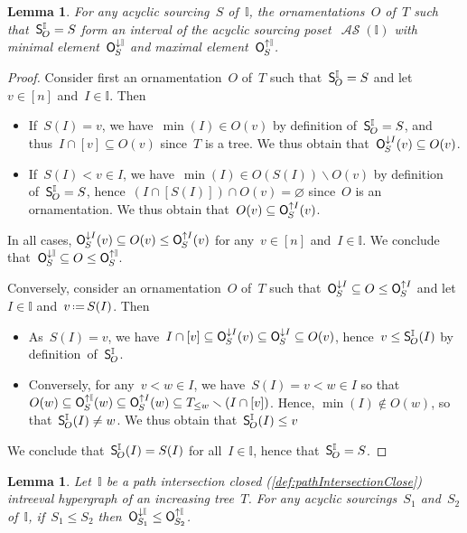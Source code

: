 \documentclass{amsart}
\newtheorem{lemma}[theorem]{Lemma}
\theoremstyle{definition}
\newcommand{\ssm}{\smallsetminus} %
\newcommand{\eqdef}{\mbox{\,\raisebox{0.2ex}{\scriptsize\ensuremath{\mathrm:}}\ensuremath{=}\,}} %
\newcommand{\lessin}[2]{#1_{\le#2}} %
\newcommand{\mymap}[2]{\mathsf{#1}_{\hspace{-.7pt}#2}}
\newcommand{\minorn}[2]{\mymap{O}{#1}^{\downarrow#2}}  %
\newcommand{\maxorn}[2]{\mymap{O}{#1}^{\uparrow#2}}  %
\newcommand{\sour}[1]{\mymap{S}{#1}}  %
\DeclareMathOperator{\ASour}{\mathcal{AS}}  %
\newcommand{\II}{\mathbb I} %
\begin{document}
\begin{lemma}
\label{lem:Sour2OrnIntreeval2}
For any acyclic sourcing~$S$ of~$\II$, the ornamentations~$O$ of~$T$ such that~$\sour{O}^\II = S$ form an interval of the acyclic sourcing poset~$\ASour(\II)$ with minimal element~$\minorn{S}{\II}$ and maximal element~$\maxorn{S}{\II}$.
\end{lemma}

\begin{proof}
Consider first an ornamentation~$O$ of~$T$ such that~$\sour{O}^\II = S$ and let~$v \in [n]$ and~$I \in \II$. Then
\begin{itemize}
\item If~$S(I) = v$, we have~$\min(I) \in O(v)$ by definition of~$\sour{O}^\II = S$, and thus~$I \cap [v] \subseteq O(v)$ since~$T$ is a tree.
We thus obtain that~$\minorn{S}{I}(v) \subseteq O(v)$.
\item If~$S(I) < v \in I$, we have~$\min(I) \in O(S(I)) \ssm O(v)$ by definition of~$\sour{O}^\II = S$, hence~$(I \cap [S(I)]) \cap O(v) = \varnothing$ since~$O$ is an ornamentation.
We thus obtain that~$O(v) \subseteq \maxorn{S}{I}(v)$.
\end{itemize}
In all cases, $\minorn{S}{I}(v) \subseteq O(v) \le \maxorn{S}{I}(v)$ for any~$v \in [n]$ and~$I \in \II$.
We conclude that~$\minorn{S}{\II} \subseteq O \le \maxorn{S}{\II}$.

Conversely, consider an ornamentation~$O$ of~$T$ such that~$\minorn{S}{I} \subseteq O \le \maxorn{S}{I}$ and let~$I \in \II$ and~$v \eqdef S(I)$. Then
\begin{itemize}
\item As~$S(I) = v$, we have~$I \cap [v] \subseteq \minorn{S}{I}(v) \subseteq \minorn{S}{I} \subseteq O(v)$, hence~$v \le \sour{O}^\II(I)$ by definition~of~$\sour{O}^\II$.
\item Conversely, for any~$v < w \in I$, we have~$S(I) = v < w \in I$ so that~$O(w) \subseteq \maxorn{S}{\II}(w) \subseteq \maxorn{S}{I}(w) \subseteq \lessin{T}{w} \ssm (I \cap [v])$. Hence, $\min(I) \notin O(w)$, so that~$\sour{O}^\II(I) \ne w$. We thus obtain that~$\sour{O}^\II(I) \le v$
\end{itemize}
We conclude that~$\sour{O}^\II(I) = S(I)$ for all~$I \in \II$, hence that~$\sour{O}^\II = S$.
\end{proof}

\begin{lemma}
\label{lem:Sour2OrnIntreeval3}
Let~$\II$ be a path intersection closed (\cref{def:pathIntersectionClose}) intreeval hypergraph of an increasing tree~$T$.
For any acyclic sourcings~$S_1$ and~$S_2$ of~$\II$, if~$S_1 \le S_2$ then~$\minorn{S_1}{\II} \le \maxorn{S_2}{\II}$.
\end{lemma}
\end{document}
